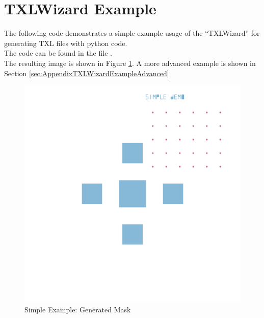 \section{TXLWizard Example}
The following code demonstrates a simple example usage of the ``TXLWizard'' for
generating TXL files with python code. \\
The code can be found in the file .\\
The resulting image is shown in Figure \ref{fig:TXLWizardSimpleExample}.
A more advanced example is shown in Section \ref{sec:AppendixTXLWizardExampleAdvanced}



\begin{figure}[!htbp]
    \centering
     \includegraphics[width=\textwidth]{Content/Masks/Example_Simple.pdf}
    \caption{Simple Example: Generated Mask}
    \label{fig:TXLWizardSimpleExample}
\end{figure}